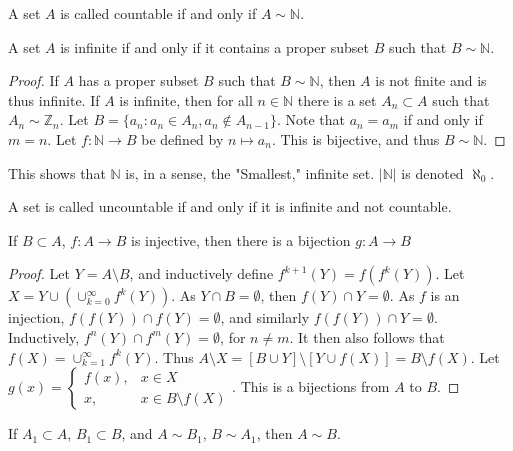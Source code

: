         \begin{definition}
            A set $A$ is called countable if and only if $A\sim \mathbb{N}$.
        \end{definition}
        \begin{theorem}
        A set $A$ is infinite if and only if it contains a proper subset $B$ such that $B\sim \mathbb{N}$.
        \end{theorem}
        \begin{proof}
        If $A$ has a proper subset $B$ such that $B\sim \mathbb{N}$, then $A$ is not finite and is thus infinite.
        If $A$ is infinite, then for all $n\in \mathbb{N}$ there is a set $A_n\subset A$ such that
        $A_n \sim \mathbb{Z}_n$. Let $B = \{a_n: a_n \in A_n, a_n \notin A_{n-1}\}$.
        Note that $a_{n} = a_{m}$ if and only if $m= n$. Let $f:\mathbb{N} \rightarrow B$
        be defined by $n\mapsto a_n$. This is bijective, and thus $B\sim \mathbb{N}$.
        \end{proof}
        This shows that $\mathbb{N}$ is, in a sense, the "Smallest,"
        infinite set. $|\mathbb{N}|$ is denoted $\aleph_0$.
        \begin{definition}
        A set is called uncountable if and only if it is infinite and not countable.
        \end{definition}
        \begin{theorem}
            If $B\subset A$, $f:A\rightarrow B$ is injective, then there
            is a bijection $g:A\rightarrow B$
        \end{theorem}
        \begin{proof}
            Let $Y = A\setminus B$, and inductively define
            $f^{k+1}(Y)=f(f^{k}(Y))$. Let
            $X=Y\cup(\cup_{k=0}^{\infty}f^{k}(Y))$. As  $Y\cap{B}=\emptyset$,
            then $f(Y)\cap Y= \emptyset$. As $f$ is an injection,
            $f(f(Y))\cap f(Y)=\emptyset$,
            and similarly $f(f(Y))\cap Y = \emptyset$. Inductively,
            $f^{n}(Y)\cap f^{m}(Y)=\emptyset$,
        for $n\ne m$. It then also follows that $f(X) = \cup_{k=1}^{\infty} f^{k}(Y)$.
        Thus $A\setminus X = [B\cup Y]\setminus [Y\cup f(X)] = B\setminus f(X)$.
        Let $g(x) = \begin{cases} f(x), & x\in X \\ x, & x \in B\setminus f(X)\end{cases}$.
        This is a bijections from $A$ to $B$.
        \end{proof}
        \begin{theorem}
        If $A_1 \subset A$, $B_1 \subset B$, and $A\sim B_1$, $B \sim A_1$, then $A\sim B$.
        \end{theorem}
